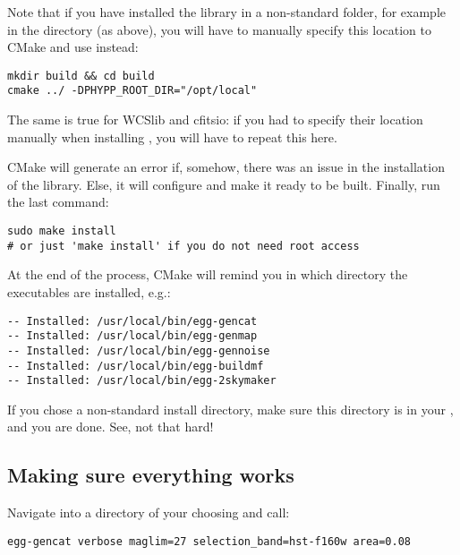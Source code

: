 \begin{enumerate}
Note that if you have installed the \phypp library in a non-standard folder, for example in the  directory (as above), you will have to manually specify this location to CMake and use instead:
\begin{verbatim}
mkdir build && cd build
cmake ../ -DPHYPP_ROOT_DIR="/opt/local"
\end{verbatim}
The same is true for WCSlib and cfitsio: if you had to specify their location manually when installing \phypp, you will have to repeat this here.

CMake will generate an error if, somehow, there was an issue in the installation of the \phypp library. Else, it will configure \egg and make it ready to be built. Finally, run the last command:
\begin{verbatim}
sudo make install
# or just 'make install' if you do not need root access
\end{verbatim}
\end{enumerate}
At the end of the process, CMake will remind you in which directory the \egg executables are installed, e.g.:
\begin{verbatim}
-- Installed: /usr/local/bin/egg-gencat
-- Installed: /usr/local/bin/egg-genmap
-- Installed: /usr/local/bin/egg-gennoise
-- Installed: /usr/local/bin/egg-buildmf
-- Installed: /usr/local/bin/egg-2skymaker
\end{verbatim}
If you chose a non-standard install directory, make sure this directory is in your , and you are done. See, not that hard!

\subsection{Making sure everything works}

Navigate into a directory of your choosing and call:
\begin{verbatim}
egg-gencat verbose maglim=27 selection_band=hst-f160w area=0.08
\end{verbatim}

